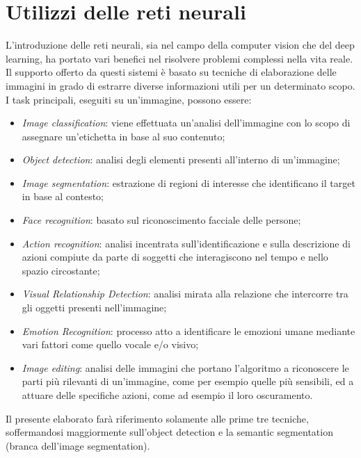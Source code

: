 \section{Utilizzi delle reti neurali}
L'introduzione delle reti neurali, sia nel campo della computer vision che del deep 
learning, ha portato vari benefici nel risolvere problemi complessi nella vita reale. 
Il supporto offerto da questi sistemi è basato su tecniche di elaborazione delle 
immagini in grado di estrarre diverse informazioni utili per un determinato scopo. 
I task principali, eseguiti su un'immagine, possono essere:
\begin{itemize}
    \item \emph{Image classification}: viene effettuata un'analisi dell'immagine con lo scopo 
    di assegnare un'etichetta in base al suo contenuto;
    \item \emph{Object detection}: analisi degli elementi presenti all'interno di un'immagine;
    \item \emph{Image segmentation}: estrazione di regioni di interesse che identificano il 
    target in base al contesto;
    \item \emph{Face recognition}: basato sul riconoscimento facciale delle persone;
    \item \emph{Action recognition}: analisi incentrata sull'identificazione e sulla descrizione 
    di azioni compiute da parte di soggetti che interagiscono nel tempo e nello 
    spazio circostante;
    \item \emph{Visual Relationship Detection}: analisi mirata alla relazione che intercorre 
    tra gli oggetti presenti nell'immagine;
    \item \emph{Emotion Recognition}: processo atto a identificare le emozioni umane mediante 
    vari fattori come quello vocale e/o visivo;
    \item \emph{Image editing}: analisi delle immagini che portano l'algoritmo a riconoscere 
    le parti più rilevanti di un'immagine, come per esempio quelle più sensibili, 
    ed a attuare delle specifiche azioni, come ad esempio il loro oscuramento.
\end{itemize}
Il presente elaborato farà riferimento solamente alle prime tre tecniche, soffermandosi 
maggiormente sull'object detection e la semantic segmentation (branca 
dell'image segmentation).

